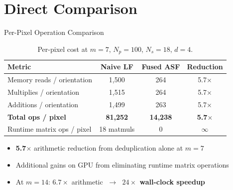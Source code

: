 \documentclass[10pt, aspectratio=169]{beamer}
\begin{document}
\section{Direct Comparison}

\begin{frame}{Per-Pixel Operation Comparison}
  \begin{table}
    \centering
    \caption{Per-pixel cost at $m{=}7$, $N_p{=}100$, $N_s{=}18$, $d{=}4$.}
    \begin{tabular}{lccc}
      \toprule
      \textbf{Metric} & \textbf{Naive LF} & \textbf{Fused ASF} & \textbf{Reduction} \\
      \midrule
      Memory reads / orientation   & 1,500        & 264          & 5.7$\times$ \\
      Multiplies / orientation     & 1,515        & 264          & 5.7$\times$ \\
      Additions / orientation      & 1,499        & 263          & 5.7$\times$ \\
      \midrule
      \textbf{Total ops / pixel}   & \textbf{81,252} & \textbf{14,238} & \textbf{5.7$\times$} \\
      Runtime matrix ops / pixel   & 18 matmuls   & 0            & $\infty$ \\
      \bottomrule
    \end{tabular}
  \end{table}

  \vspace{0.3em}
  \begin{itemize}
    \item \textbf{5.7$\times$} arithmetic reduction from deduplication alone at $m{=}7$
    \item Additional gains on GPU from eliminating runtime matrix operations
    \item At $m{=}14$: $6.7\times$ arithmetic $\;\to\;$ \textbf{$24\times$ wall-clock speedup}
  \end{itemize}
\end{frame}
\end{document}
